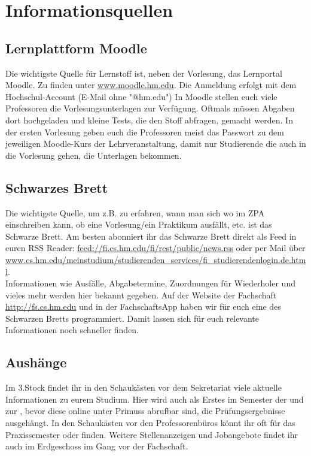 \section{Informationsquellen}

\subsection{Lernplattform Moodle}
Die wichtigste Quelle für Lernstoff ist, neben der Vorlesung, das Lernportal Moodle. Zu finden unter \url{www.moodle.hm.edu}.
Die Anmeldung erfolgt mit dem Hochschul-Account (E-Mail ohne "@hm.edu")\doublebreak
In Moodle stellen euch viele Professoren die Vorlesungsunterlagen zur Verfügung. Oftmals müssen Abgaben dort hochgeladen und kleine Tests, die den Stoff abfragen, gemacht werden.
In der ersten Vorlesung geben euch die Professoren meist das Passwort zu dem jeweiligen Moodle-Kurs der Lehrveranstaltung, damit nur Studierende die auch in die Vorlesung gehen, die Unterlagen bekommen.

\subsection{Schwarzes Brett}
Die wichtigste Quelle, um z.B. zu erfahren, wann man sich wo im ZPA einschreiben kann, ob eine Vorlesung/ein Praktikum ausfällt, etc. ist das Schwarze Brett.\doublebreak 
Am besten abonniert ihr das Schwarze Brett direkt als Feed in euren RSS Reader: \url{feed://fi.cs.hm.edu/fi/rest/public/news.rss} oder per Mail über \url{www.cs.hm.edu/meinstudium/studierenden\_services/fi\_studierendenlogin.de.html}.\\
Informationen wie Ausfälle, Abgabetermine, Zuordnungen für Wiederholer und vieles mehr werden hier bekannt gegeben.
Auf der Website der Fachschaft \url{http://fs.cs.hm.edu} und in der FachschaftsApp haben wir für euch eine  des Schwarzen Bretts
programmiert. Damit lassen sich für euch relevante Informationen noch schneller finden.

\subsection{Aushänge}
Im 3.Stock findet ihr in den Schaukästen vor dem Sekretariat viele 
aktuelle Informationen zu eurem Studium. Hier wird auch als Erstes im 
Semester der  und zur , bevor diese 
online unter Primuss abrufbar sind, die Prüfungsergebnisse ausgehängt. In den
Schaukästen vor den Professorenbüros könnt ihr oft  
für das Praxissemester oder  finden. 
Weitere Stellenanzeigen und Jobangebote findet ihr auch im 
Erdgeschoss im Gang vor der Fachschaft. 

